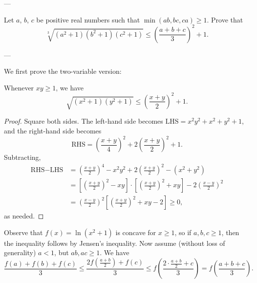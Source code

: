 
---

Let $a$, $b$, $c$ be positive real numbers such that $\min(ab,bc,ca)\ge1$. Prove that
\[\sqrt[3]{\left(a^2+1\right)\left(b^2+1\right)\left(c^2+1\right)}\le\left(\frac{a+b+c}3\right)^2+1.\]

---

We first prove the two-variable version:
\begin{lemma*}
    Whenever $xy\ge1$, we have
    \[\sqrt{\left(x^2+1\right)\left(y^2+1\right)}\le\left(\frac{x+y}2\right)^2+1.\]
\end{lemma*}
\begin{proof}
    Square both sides. The left-hand side becomes $\text{LHS}=x^2y^2+x^2+y^2+1$, and the right-hand side becomes
    \[\text{RHS}=\left(\frac{x+y}4\right)^2+2\left(\frac{x+y}2\right)^2+1.\]
    Subtracting,
    \begin{align*}
        \text{RHS}-\text{LHS}&=\left(\frac{x+y}2\right)^4-x^2y^2+2\left(\frac{x+y}2\right)^2-\left(x^2+y^2\right)\\
        &=\left[\left(\frac{x+y}2\right)^2-xy\right]\cdot\left[\left(\frac{x+y}2\right)^2+xy\right]-2\left(\frac{x-y}2\right)^2\\
        &=\left(\frac{x-y}2\right)^2\left[\left(\frac{x+y}2\right)^2+xy-2\right]\ge0,
    \end{align*}
    as needed.
\end{proof}

Observe that $f(x)=\ln(x^2+1)$ is concave for $x\ge1$, so if $a,b,c\ge1$, then the inequality follows by Jensen's inequality. Now assume (without loss of generality) $a<1$, but $ab,ac\ge1$. We have
\[\frac{f(a)+f(b)+f(c)}3\le\frac{2f\left(\frac{a+b}2\right)+f(c)}3\le f\left(\frac{2\cdot\frac{a+b}2+c}3\right)=f\left(\frac{a+b+c}3\right).\]

